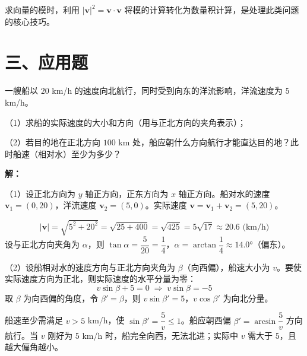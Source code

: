 \documentclass[12pt, a4paper]{ctexart}
\begin{document}
\begin{tipbox}[方法总结]
求向量的模时，利用 $|\boldsymbol{v}|^2=\boldsymbol{v}\cdot\boldsymbol{v}$ 将模的计算转化为数量积计算，是处理此类问题的核心技巧。
\end{tipbox}

\section*{\textcolor{apppurple}{三、应用题}}

\begin{appbox}[【应用1】航行问题]
一艘船以 $20$ km/h 的速度向北航行，同时受到向东的洋流影响，洋流速度为 $5$ km/h。

（1）求船的实际速度的大小和方向（用与正北方向的夹角表示）；

（2）若目的地在正北方向 $100$ km 处，船应朝什么方向航行才能直达目的地？此时船速（相对水）至少为多少？

\textbf{解：}

（1）设正北方向为 $y$ 轴正方向，正东方向为 $x$ 轴正方向。船对水的速度 $\boldsymbol{v}_1=(0,20)$，洋流速度 $\boldsymbol{v}_2=(5,0)$。实际速度 $\boldsymbol{v}=\boldsymbol{v}_1+\boldsymbol{v}_2=(5,20)$。

\[
|\boldsymbol{v}|=\sqrt{5^2+20^2}=\sqrt{25+400}=\sqrt{425}=5\sqrt{17}\approx20.6 \text{ (km/h)}
\]
设与正北方向夹角为 $\alpha$，则 $\tan\alpha=\dfrac{5}{20}=\dfrac{1}{4}$，$\alpha=\arctan\dfrac{1}{4}\approx14.0°$（偏东）。

（2）设船相对水的速度方向与正北方向夹角为 $\beta$（向西偏），船速大小为 $v$。要使实际速度方向为正北，则实际速度的水平分量为零：
\[
v\sin\beta+5=0 \;\Longrightarrow\; v\sin\beta=-5
\]
取 $\beta$ 为向西偏的角度，令 $\beta'=\beta$，则 $v\sin\beta'=5$，$v\cos\beta'$ 为向北分量。

船速至少需满足 $v>5$ km/h，使 $\sin\beta'=\dfrac{5}{v}\leqslant1$。船应朝西偏 $\beta'=\arcsin\dfrac{5}{v}$ 方向航行。当 $v$ 刚好为 $5$ km/h 时，船完全向西，无法北进；实际中 $v$ 需大于 $5$，且越大偏角越小。
\end{appbox}
\end{document}
